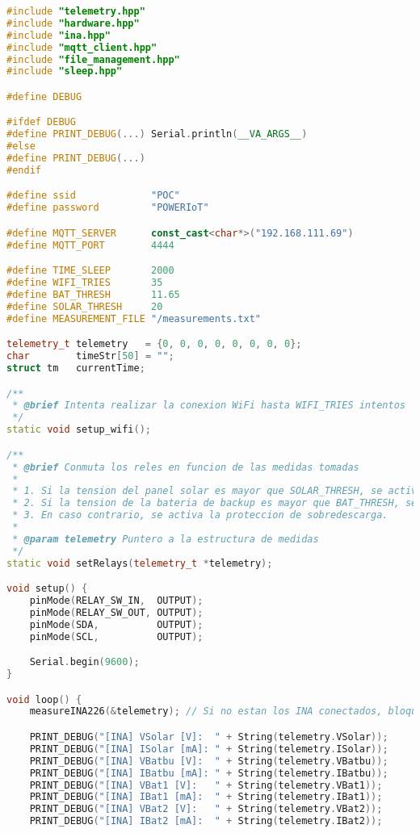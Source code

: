 \begin{lstlisting}[language=c++,caption={Fichero\texttt{MAIN\_POWER.ino}}, captionpos=b]
#include "telemetry.hpp"
#include "hardware.hpp"
#include "ina.hpp"
#include "mqtt_client.hpp"
#include "file_management.hpp"
#include "sleep.hpp"

#define DEBUG

#ifdef DEBUG
#define PRINT_DEBUG(...) Serial.println(__VA_ARGS__)
#else
#define PRINT_DEBUG(...)
#endif

#define ssid             "POC"
#define password         "POWERIoT"

#define MQTT_SERVER      const_cast<char*>("192.168.111.69")
#define MQTT_PORT        4444

#define TIME_SLEEP       2000
#define WIFI_TRIES       35
#define BAT_THRESH       11.65
#define SOLAR_THRESH     20
#define MEASUREMENT_FILE "/measurements.txt"

telemetry_t telemetry   = {0, 0, 0, 0, 0, 0, 0, 0};
char        timeStr[50] = "";
struct tm   currentTime;

/**
 * @brief Intenta realizar la conexion WiFi hasta WIFI_TRIES intentos
 */
static void setup_wifi();

/**
 * @brief Conmuta los reles en funcion de las medidas tomadas
 * 
 * 1. Si la tension del panel solar es mayor que SOLAR_THRESH, se activa el panel solar.
 * 2. Si la tension de la bateria de backup es mayor que BAT_THRESH, se activa la bateria de backup.
 * 3. En caso contrario, se activa la proteccion de sobredescarga.
 * 
 * @param telemetry Puntero a la estructura de medidas
 */
static void setRelays(telemetry_t *telemetry);

void setup() {
    pinMode(RELAY_SW_IN,  OUTPUT);
    pinMode(RELAY_SW_OUT, OUTPUT);
    pinMode(SDA,          OUTPUT);
    pinMode(SCL,          OUTPUT);

    Serial.begin(9600);
}

void loop() {
    measureINA226(&telemetry); // Si no estan los INA conectados, bloquea

    PRINT_DEBUG("[INA] VSolar [V]:  " + String(telemetry.VSolar));
    PRINT_DEBUG("[INA] ISolar [mA]: " + String(telemetry.ISolar));
    PRINT_DEBUG("[INA] VBatbu [V]:  " + String(telemetry.VBatbu));
    PRINT_DEBUG("[INA] IBatbu [mA]: " + String(telemetry.IBatbu));
    PRINT_DEBUG("[INA] VBat1 [V]:   " + String(telemetry.VBat1));
    PRINT_DEBUG("[INA] IBat1 [mA]:  " + String(telemetry.IBat1));
    PRINT_DEBUG("[INA] VBat2 [V]:   " + String(telemetry.VBat2));
    PRINT_DEBUG("[INA] IBat2 [mA]:  " + String(telemetry.IBat2));


\end{lstlisting}
